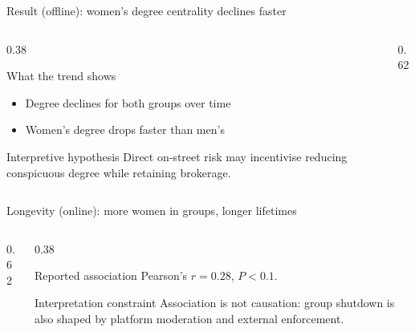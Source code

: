 \begin{frame}{Result (offline): women's degree centrality declines faster}
  \small
  \begin{columns}[T,onlytextwidth]
    \begin{column}{0.38\textwidth}
      \begin{block}{What the trend shows}
        \begin{itemize}
          \item Degree declines for both groups over time
          \item Women's degree drops faster than men's
        \end{itemize}
      \end{block}

      \begin{exampleblock}{Interpretive hypothesis}
        Direct on-street risk may incentivise reducing conspicuous degree while retaining brokerage.
      \end{exampleblock}
    \end{column}

    \begin{column}{0.62\textwidth}
    \end{column}
  \end{columns}

\end{frame}
\begin{frame}{Longevity (online): more women in groups, longer lifetimes}
  \small
  \begin{columns}[T,onlytextwidth]
    \begin{column}{0.62\textwidth}
    \end{column}

    \begin{column}{0.38\textwidth}
      \begin{block}{Reported association}
        Pearson's $r = 0.28$, $P < 0.1$.
      \end{block}

      \begin{exampleblock}{Interpretation constraint}
        Association is not causation: group shutdown is also shaped by platform moderation and external enforcement.
      \end{exampleblock}
    \end{column}
  \end{columns}

\end{frame}

